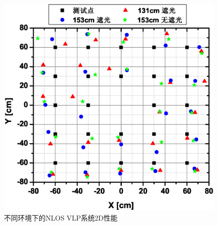   
     \begin{figure}[!htbp]
                \centering
                \includegraphics[width=0.7\linewidth]{FIG/5-8.eps}
                \caption{不同环境下的NLOS VLP系统2D性能}
                \label{fig:errors-2D}
\end{figure}


